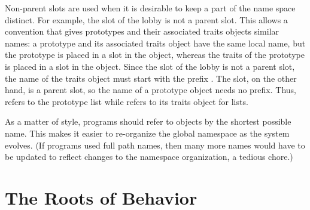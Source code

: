 \documentclass[letterpaper,10pt,english]{sphinxmanual}
\begin{document}
Non-parent slots are used when it is desirable to keep a part of the name space distinct. For example,
the  slot of the lobby is not a parent slot. This allows a convention that gives prototypes
and their associated traits objects similar names: a prototype and its associated traits object have
the same local name, but the prototype is placed in a slot in the  object, whereas the traits
of the prototype is placed in a slot in the  object. Since the  slot of the lobby is not
a parent slot, the name of the traits object must start with the prefix . The  slot,
on the other hand, is a parent slot, so the name of a prototype object needs no prefix. Thus, 
refers to the prototype list while  refers to its traits object for lists.

As a matter of style, programs should refer to objects by the shortest possible name. This makes it
easier to re-organize the global namespace as the system evolves. (If programs used full path
names, then many more names would have to be updated to reflect changes to the namespace organization,
a tedious chore.)


\section{The Roots of Behavior}
\label{roots::doc}\label{roots:the-roots-of-behavior}
\end{document}
